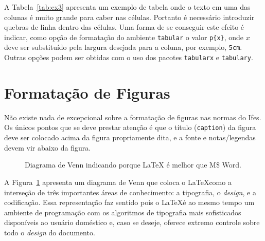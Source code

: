 \documentclass[times,english,brazil,oneside]{ifes7}
\begin{document}
A Tabela~\ref{tab:ex3} apresenta um exemplo de tabela onde o texto em
uma das colunas é muito grande para caber nas células. Portanto é
necessário introduzir quebras de linha dentro das células. Uma forma
de se conseguir este efeito é indicar, como opção de formatação do
ambiente \texttt{tabular} o valor \verb!p{x}!, onde $x$ deve ser
substituído pela largura desejada para a coluna, por exemplo,
\texttt{5cm}. Outras opções podem ser obtidas com o uso dos pacotes
\texttt{tabularx} e \texttt{tabulary}.



\section{Formatação de Figuras}
\label{sec:format-figuras}

Não existe nada de excepcional sobre a formatação de figuras nas
normas do Ifes. Os únicos pontos que se deve prestar atenção é que o
título (\texttt{caption}) da figura deve ser colocado acima da figura
propriamente dita, e a fonte e notas/legendas devem vir abaixo da
figura.

\begin{figure}[h]
  \centering
  \caption{Diagrama de Venn indicando porque \LaTeX{} é melhor que M\$
    Word.}
  \label{fig:ex1}
\end{figure}

A Figura~\ref{fig:ex1} apresenta um diagrama de Venn que coloca o
\LaTeX como a interseção de três importantes áreas de conhecimento: a
tipografia, o \emph{design}, e a codificação. Essa representação faz
sentido pois o \LaTeX é ao mesmo tempo um ambiente de programação com
os algoritmos de tipografia mais sofisticados disponíveis ao usuário
doméstico e, caso se deseje, oferece extremo controle sobre todo o
\emph{design} do documento.
\end{document}
